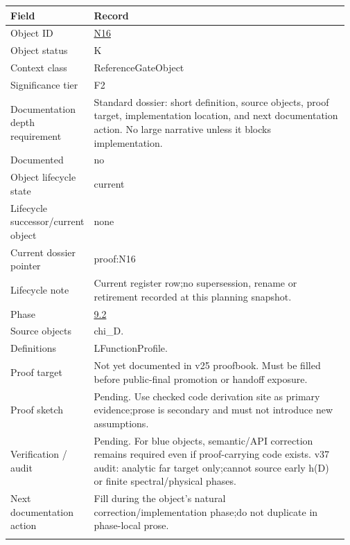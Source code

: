 \begin{longtable}{L{0.16\linewidth} L{0.81\linewidth}}
\hline
\textbf{Field} & \textbf{Record}\\
\hline
Object ID & \hyperlink{object-row-N16}{N16}\\
\hline\addlinespace[0.20em]
Object status & K\\
\hline\addlinespace[0.20em]
Context class & ReferenceGateObject\\
\hline\addlinespace[0.20em]
Significance tier & F2\\
\hline\addlinespace[0.20em]
Documentation depth requirement & Standard dossier: short definition, source objects, proof target, implementation location, and next documentation action. No large narrative unless it blocks implementation.\\
\hline\addlinespace[0.20em]
Documented & no\\
\hline\addlinespace[0.20em]
Object lifecycle state & current\\
\hline\addlinespace[0.20em]
Lifecycle successor/\allowbreak{}current object & none\\
\hline\addlinespace[0.20em]
Current dossier pointer & proof:N16\\
\hline\addlinespace[0.20em]
Lifecycle note & Current register row;\newline no supersession, rename or retirement recorded at this planning snapshot.\\
\hline\addlinespace[0.20em]
Phase & \hyperlink{phase-row-9-2}{9.2}\\
\hline\addlinespace[0.20em]
Source objects & chi\_D.\\
\hline\addlinespace[0.20em]
Definitions & LFunctionProfile.\\
\hline\addlinespace[0.20em]
Proof target & Not yet documented in v25 proofbook. Must be filled before public-final promotion or handoff exposure.\\
\hline\addlinespace[0.20em]
Proof sketch & Pending. Use checked code derivation site as primary evidence;\newline prose is secondary and must not introduce new assumptions.\\
\hline\addlinespace[0.20em]
Verification /\allowbreak{} audit & Pending. For blue objects, semantic/\allowbreak{}API correction remains required even if proof-carrying code exists. v37 audit: analytic far target only;\newline cannot source early h(D) or finite spectral/\allowbreak{}physical phases.\\
\hline\addlinespace[0.20em]
Next documentation action & Fill during the object's natural correction/\allowbreak{}implementation phase;\newline do not duplicate in phase-local prose.\\
\hline\addlinespace[0.20em]
\end{longtable}
